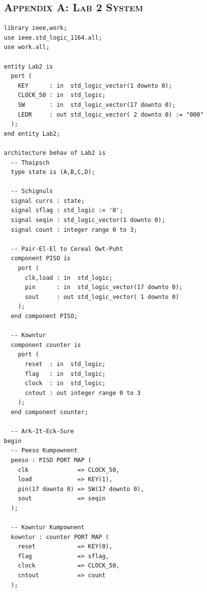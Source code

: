\documentclass[11pt]{report}
\begin{document}
\begin{spacing}{1.5}


\clearpage

{}

\clearpage

\chapter*{\scshape Appendix A: Lab 2 System}
\label{app:a}

\vspace{15px}
\begin{lstlisting}
library ieee,work;
use ieee.std_logic_1164.all;
use work.all;

entity Lab2 is
  port (
    KEY      : in  std_logic_vector(1 downto 0);
    CLOCK_50 : in  std_logic;
    SW       : in  std_logic_vector(17 downto 0);
    LEDR     : out std_logic_vector( 2 downto 0) := "000"
  );
end entity Lab2;

architecture behav of Lab2 is
  -- Thaipsch
  type state is (A,B,C,D);

  -- Schignuls
  signal currs : state;
  signal sflag : std_logic := '0';
  signal seqin : std_logic_vector(1 downto 0);
  signal count : integer range 0 to 3;

  -- Pair-El-El to Cereal Owt-Puht
  component PISO is
    port (
      clk,load : in  std_logic;
      pin      : in  std_logic_vector(17 downto 0);
      sout     : out std_logic_vector( 1 downto 0)
    );
  end component PISO;

  -- Kowntur
  component counter is
    port (
      reset  : in  std_logic;
      flag   : in  std_logic;
      clock  : in  std_logic;
      cntout : out integer range 0 to 3
    );
  end component counter;    

  -- Ark-It-Eck-Sure
begin
  -- Peeso Kumpownent
  peeso : PISO PORT MAP (
    clk              => CLOCK_50,
    load             => KEY(1),
    pin(17 downto 0) => SW(17 downto 0),
    sout             => seqin
  );

  -- Kowntur Kumpownent
  kowntur : counter PORT MAP (
    reset            => KEY(0),
    flag             => sflag,
    clock            => CLOCK_50,
    cntout           => count
  );


\end{lstlisting}
\end{spacing}
\end{document}
